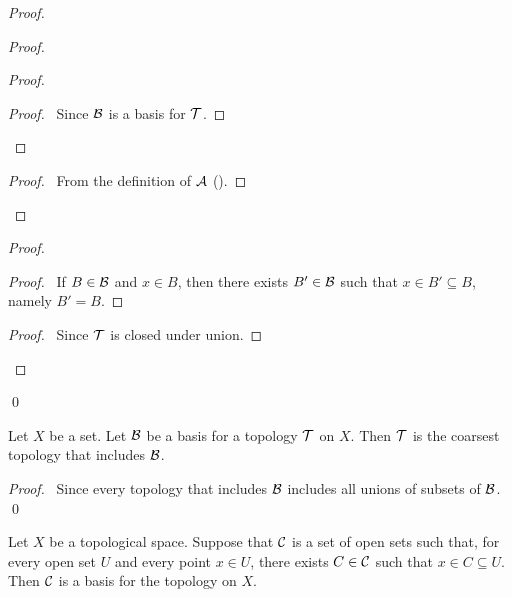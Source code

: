 \begin{proof}
    \pf
    \begin{proof}
        \begin{proof}
            \begin{proof}
                \pf\ Since $\BB$ is a basis for $\TT$.
            \end{proof}
        \end{proof}
        \begin{proof}
            \pf\ From the definition of $\AA$ ().
        \end{proof}
    \end{proof}
    \begin{proof}
        \begin{proof}
            \pf\ If $B \in \BB$ and $x \in B$, then there exists $B' \in \BB$ such that $x \in B' \subseteq B$, namely $B' = B$.
        \end{proof}
        \qedstep
        \begin{proof}
            \pf\ Since $\TT$ is closed under union.
        \end{proof}
    \end{proof}
    \qed
\end{proof}

\begin{corollary}
    \label{cor:basis_open}
    Let $X$ be a set. Let $\BB$ be a basis for a topology $\TT$ on $X$. Then $\TT$ is the coarsest topology
    that includes $\BB$.
\end{corollary}

\begin{proof}
    \pf\ Since every topology that includes $\BB$ includes all unions of subsets of $\BB$. \qed
\end{proof}

\begin{lemma}
    \label{lemma:basis}
    Let $X$ be a topological space. Suppose that $\CC$ is a set of open sets such that, for every open set $U$ and every point $x \in U$,
    there exists $C \in \CC$ such that $x \in C \subseteq U$. Then $\CC$ is a basis for the topology on $X$.
\end{lemma}

